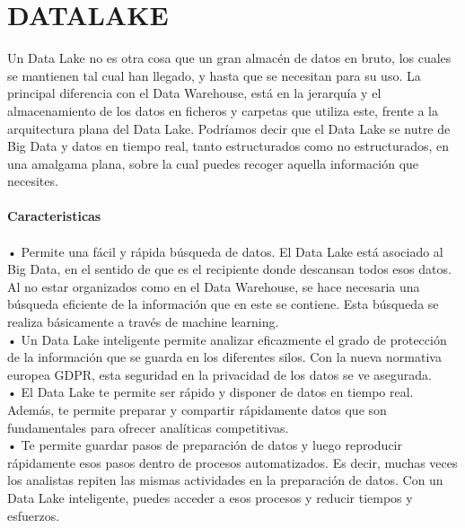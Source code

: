 \section{DATALAKE}
\item{Un Data Lake no es otra cosa que un gran almacén de datos en bruto, los cuales se mantienen tal cual han llegado, y hasta que se necesitan para su uso. La principal diferencia con el Data Warehouse, está en la jerarquía y el almacenamiento de los datos en ficheros y carpetas que utiliza este, frente a la arquitectura plana del Data Lake. Podríamos decir que el Data Lake se nutre de Big Data y datos en tiempo real, tanto estructurados como no estructurados, en una amalgama plana, sobre la cual puedes recoger aquella información que necesites.\\\\
\textbf{Caracteristicas}\\\\
•	Permite una fácil y rápida búsqueda de datos. El Data Lake está asociado al Big Data, en el sentido de que es el recipiente donde descansan todos esos datos. Al no estar organizados como en el Data Warehouse, se hace necesaria una búsqueda eficiente de la información que en este se contiene. Esta búsqueda se realiza básicamente a través de machine learning.\\
•	Un Data Lake inteligente permite analizar eficazmente el grado de protección de la información que se guarda en los diferentes silos. Con la nueva normativa europea GDPR, esta seguridad en la privacidad de los datos se ve asegurada.\\
•	El Data Lake te permite ser rápido y disponer de datos en tiempo real. Además, te permite preparar y compartir rápidamente datos que son fundamentales para ofrecer analíticas competitivas.\\
•	Te permite guardar pasos de preparación de datos y luego reproducir rápidamente esos pasos dentro de procesos automatizados. Es decir, muchas veces los analistas repiten las mismas actividades en la preparación de datos. Con un Data Lake inteligente, puedes acceder a esos procesos y reducir tiempos y esfuerzos.
}
